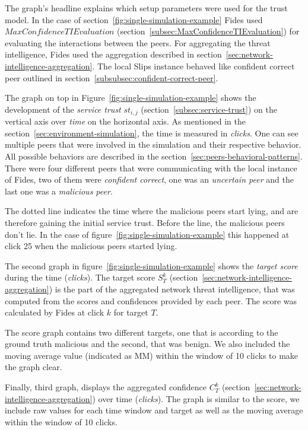 The graph's headline explains which setup parameters were used for the trust model. In the case of section~\ref{fig:single-simulation-example} Fides used $MaxConfidenceTIEvaluation$ (section~\ref{subsec:MaxConfidenceTIEvaluation}) for evaluating the interactions between the peers.
For aggregating the threat intelligence, Fides used the aggregation described in  section~\ref{sec:network-intelligence-aggregation}.
The local Slips instance behaved like confident correct peer outlined in  section~\ref{subsubsec:confident-correct-peer}.

The graph on top in Figure~\ref{fig:single-simulation-example} shows the development of the \textit{service trust} $st_{i, j}$ (section~\ref{subsec:service-trust}) on the vertical axis over \textit{time} on the horizontal axis. As mentioned in the section~\ref{sec:environment-simulation}, the time is measured in \textit{clicks}.
One can see multiple peers that were involved in the simulation and their respective behavior. All possible behaviors are described in the section~\ref{sec:peers-behavioral-patterns}.
There were four different peers that were communicating with the local instance of Fides, two of them were \textit{confident correct}, one was an \textit{uncertain peer} and the last one was a \textit{malicious peer}.

The dotted line indicates the time where the malicious peers start lying, and are therefore gaining the initial service trust. Before the line, the malicious peers don't lie.
In the case of figure~\ref{fig:single-simulation-example} this happened at click 25 when the malicious peers started lying.

The second graph in figure~\ref{fig:single-simulation-example} shows the \textit{target score} during the time (\textit{clicks}).
The target score $S^{k}_{T}$ (section~\ref{sec:network-intelligence-aggregation}) is the part of the aggregated network threat intelligence, that was computed from the scores and confidences provided by each peer.
The score was calculated by Fides at click $k$ for target $T$.

The score graph contains two different targets, one that is according to the ground truth malicious and the second, that was benign.
We also included the moving average value (indicated as MM) within the window of 10 clicks to make the graph clear.

Finally, third graph, displays the aggregated confidence $C^{k}_{T}$ (section~\ref{sec:network-intelligence-aggregation}) over time (\textit{clicks}).
The graph is similar to the score, we include raw values for each time window and target as well as the moving average within the window of 10 clicks.

